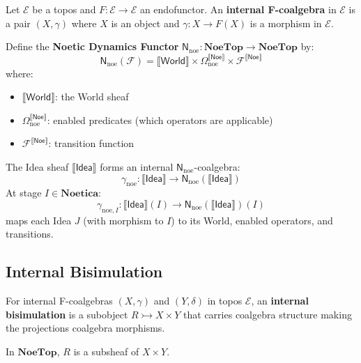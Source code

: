 \begin{definition}
\label{def:internal-coalgebra}
Let $\mathcal{E}$ be a topos and $F : \mathcal{E} \to \mathcal{E}$ an endofunctor.
An \textbf{internal F-coalgebra} in $\mathcal{E}$ is a pair $(X, \gamma)$ where
$X$ is an object and $\gamma : X \to F(X)$ is a morphism in $\mathcal{E}$.
\end{definition}

\begin{definition}
\label{def:noetic-dynamics-object}
Define the \textbf{Noetic Dynamics Functor} $\mathsf{N}_{\mathrm{noe}} : \mathbf{NoeTop} \to \mathbf{NoeTop}$ by:
\[
  \mathsf{N}_{\mathrm{noe}}(\mathcal{F}) = \llbracket \mathsf{World} \rrbracket \times \Omega_{\mathrm{noe}}^{\llbracket \mathsf{Noe} \rrbracket} \times \mathcal{F}^{\llbracket \mathsf{Noe} \rrbracket}
\]
where:
\begin{itemize}
  \item $\llbracket \mathsf{World} \rrbracket$: the World sheaf
  \item $\Omega_{\mathrm{noe}}^{\llbracket \mathsf{Noe} \rrbracket}$: enabled predicates (which operators are applicable)
  \item $\mathcal{F}^{\llbracket \mathsf{Noe} \rrbracket}$: transition function
\end{itemize}
\end{definition}

\begin{proposition}
\label{prop:idea-internal-coalgebra}
The Idea sheaf $\llbracket \mathsf{Idea} \rrbracket$ forms an internal
$\mathsf{N}_{\mathrm{noe}}$-coalgebra:
\[
  \gamma_{\mathrm{noe}} : \llbracket \mathsf{Idea} \rrbracket \to \mathsf{N}_{\mathrm{noe}}(\llbracket \mathsf{Idea} \rrbracket)
\]
At stage $I \in \mathbf{Noetica}$:
\[
  \gamma_{\mathrm{noe},I} : \llbracket \mathsf{Idea} \rrbracket(I) \to \mathsf{N}_{\mathrm{noe}}(\llbracket \mathsf{Idea} \rrbracket)(I)
\]
maps each Idea $J$ (with morphism to $I$) to its World, enabled operators, and transitions.
\end{proposition}

\subsection{Internal Bisimulation}
\label{subsec:internal-bisimulation}

\begin{definition}
\label{def:internal-bisimulation}
For internal F-coalgebras $(X, \gamma)$ and $(Y, \delta)$ in topos $\mathcal{E}$,
an \textbf{internal bisimulation} is a subobject $R \rightarrowtail X \times Y$
that carries coalgebra structure making the projections coalgebra morphisms.

In $\mathbf{NoeTop}$, $R$ is a subsheaf of $X \times Y$.
\end{definition}

